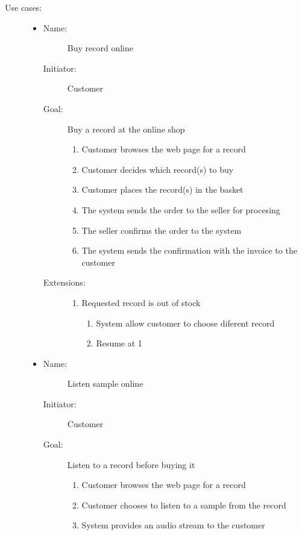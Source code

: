 \documentclass[12pt, titlepage]{article}
\begin{document}
\begin{description}
    \item[Use cases:] \hfil
    \begin{itemize}
    \item
        \begin{description}
            \item[Name:]Buy record online 
            \item[Initiator:]Customer
            \item[Goal:]Buy a record at the online shop 
            \begin{enumerate}
                \item Customer browses the web page for a record
                \item Customer decides which record(s) to buy
                \item Customer places the record(s) in the basket
                \item The system sends the order to the seller for procesing
                \item The seller confirms the order to the system
                \item The system sends the confirmation with the invoice to the customer
            \end{enumerate}
            \item[Extensions:] \hfil
            \begin{enumerate}
                \item Requested record is out of stock
                \begin{enumerate}
                    \item System allow customer to choose diferent record
                    \item Resume at 1
                \end{enumerate}
            \end{enumerate}
        \end{description}

    \item
        \begin{description}
            \item[Name:]Listen sample online 
            \item[Initiator:]Customer
            \item[Goal:]Listen to a record before buying it
            \begin{enumerate}
                \item Customer browses the web page for a record
                \item Customer chooses to listen to a sample from the record
                \item System provides an audio stream to the customer
            \end{enumerate}
        \end{description}


\end{itemize}
\end{description}
\end{document}
